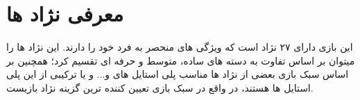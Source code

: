 \chapter{معرفی نژاد ها}
این بازی دارای ۲۷ نژاد است که ویژگی های منحصر به فرد خود را دارند.
این نژاد ها را میتوان بر اساس تفاوت به دسته های ساده، متوسط و حرفه ای تقسیم کرد؛ همچنین بر اساس سبک بازی بعضی از نژاد ها مناسب پلی استایل های  و... و یا ترکیبی از این پلی استایل ها هستند، در واقع در سبک بازی تعیین کننده ترین گزینه نژاد بازیست.

